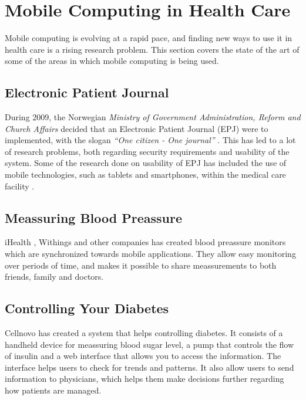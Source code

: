 \section{Mobile Computing in Health Care}
Mobile computing is evolving at a rapid pace, and finding new ways to use it in health care is a rising research problem. This section covers the state of the art of some of the areas in which mobile computing is being used.  

\subsection{Electronic Patient Journal}
During 2009, the Norwegian \emph{Ministry of Government Administration, Reform and Church Affairs} decided that an Electronic Patient Journal (EPJ) were to implemented, with the slogan \emph{``One citizen - One journal''} \cite{epjregjering}. This has led to a lot of research problems, both regarding security requirements and usability of the system. Some of the research done on usability of EPJ has included the use of mobile technologies, such as tablets and smartphones, within the medical care facility \cite{svanaes2010usability}.    

\subsection{Meassuring Blood Preassure}
iHealth , Withings  and other companies has created blood preassure monitors which are synchronized towards mobile applications. They allow easy monitoring over periods of time, and makes it possible to share meassurements to both friends, family and doctors.


\subsection{Controlling Your Diabetes}
Cellnovo  has created a system that helps controlling diabetes. It consists of a handheld device for meassuring blood sugar level, a pump that controls the flow of insulin and a web interface that allows you to access the information. The interface helps users to check for trends and patterns. It also allow users to send information to physicians, which helps them make decisions further regarding how patients are managed.
   
